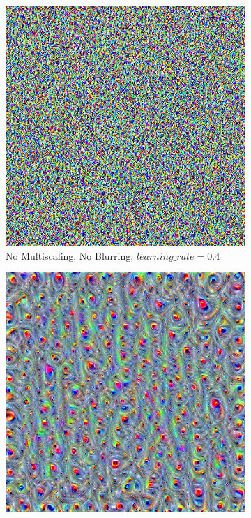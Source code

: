 \begin{figure}
    \captionsetup{justification=centering}
    
    \begin{subfigure}[t]{0.31\textwidth}
        \captionsetup{justification=centering}
        \centering
        \includegraphics[width=.7\linewidth]{figuras/feat_vis/experiments/layers/intermediary/l6/random_image_pl1_lr4e-1_layer12_no-blur.png}
        \caption{No Multiscaling, No Blurring, \(learning\_rate = 0.4\)}
    \end{subfigure}
    \hfill
    \begin{subfigure}[t]{0.31\textwidth}
        \captionsetup{justification=centering}
        \centering
        \includegraphics[width=.7\linewidth]{figuras/feat_vis/experiments/layers/intermediary/l6/random_image_pl4_lr4e-2_layer12_no-blur.png}

\end{subfigure}
\end{figure}
